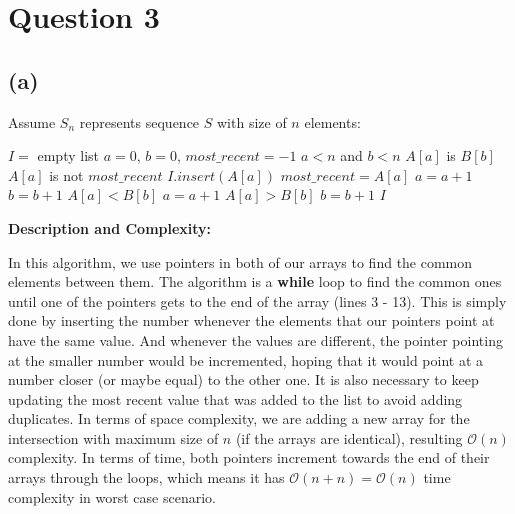 
\section{Question 3}
    \subsection{(a)}
    \begin{spacing}{1.5}
        Assume $S_n$ represents sequence $S$ with size of $n$ elements:
        \begin{codebox}
            \li $I =$ empty list
            \li $a = 0$, $b = 0$, $most\_recent = -1$
            \li \While $a < n$ and $b<n$
                \Do
                    \li \If $A[a]$ is $B[b]$
                    \Then
                        \li \If $A[a]$ is not $most\_recent$
                        \Then
                            \li $I.insert(A[a])$
                            \li $most\_recent = A[a]$
                        \End
                        \li $a = a + 1$
                        \li $b = b + 1$
                    \li \ElseIf $A[a] < B[b]$
                    \Then
                        \li $a = a + 1$
                    \li \ElseIf $A[a] > B[b]$
                    \Then
                        \li $b = b + 1$
                    \End 
                \End
            \li \Return $I$
        \end{codebox}
    \end{spacing}
    
    \textbf{Description and Complexity:}
    
    In this algorithm, we use pointers in both of our arrays to find the common elements between them.
    The algorithm is a \textbf{while} loop to find the common ones until one of the pointers gets to the end of the array (lines 3 - 13).
    This is simply done by inserting the number whenever the elements that our pointers point at have the same value.
    And whenever the values are different, the pointer pointing at the smaller number would be incremented, hoping that it 
    would point at a number closer (or maybe equal) to the other one. It is also necessary to keep updating the most recent value
    that was added to the list to avoid adding duplicates. In terms of space complexity, we are adding a new array 
    for the intersection with maximum size of $n$ (if the arrays are identical), resulting $\mathcal{O}(n)$ complexity. In terms of time, both pointers
    increment towards the end of their arrays through the loops, which means it has $\mathcal{O}(n+n)=\mathcal{O}(n)$ time complexity in worst case scenario. 
    
